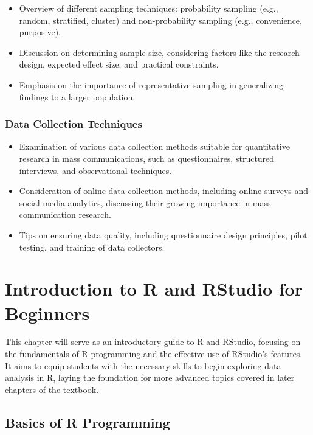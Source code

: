 \documentclass[
]{book}
\begin{document}
\begin{itemize}
\item
  Overview of different sampling techniques: probability sampling (e.g., random, stratified, cluster) and non-probability sampling (e.g., convenience, purposive).
\item
  Discussion on determining sample size, considering factors like the research design, expected effect size, and practical constraints.
\item
  Emphasis on the importance of representative sampling in generalizing findings to a larger population.
\end{itemize}

\hypertarget{data-collection-techniques}{%
\subsection*{Data Collection Techniques}\label{data-collection-techniques}}

\begin{itemize}
\item
  Examination of various data collection methods suitable for quantitative research in mass communications, such as questionnaires, structured interviews, and observational techniques.
\item
  Consideration of online data collection methods, including online surveys and social media analytics, discussing their growing importance in mass communication research.
\item
  Tips on ensuring data quality, including questionnaire design principles, pilot testing, and training of data collectors.
\end{itemize}

\hypertarget{introduction-to-r-and-rstudio-for-beginners}{%
\chapter{Introduction to R and RStudio for Beginners}\label{introduction-to-r-and-rstudio-for-beginners}}

This chapter will serve as an introductory guide to R and RStudio, focusing on the fundamentals of R programming and the effective use of RStudio's features. It aims to equip students with the necessary skills to begin exploring data analysis in R, laying the foundation for more advanced topics covered in later chapters of the textbook.

\hypertarget{basics-of-r-programming}{%
\section*{Basics of R Programming}\label{basics-of-r-programming}}
\end{document}
